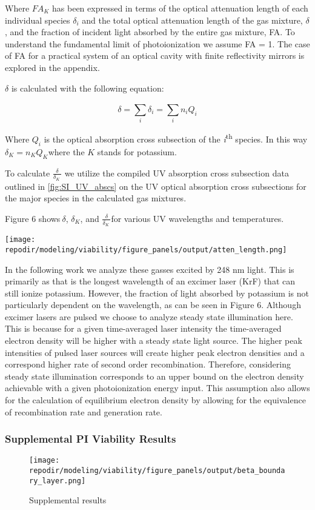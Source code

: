 Where \(FA_{K}\) has been expressed in terms of the optical attenuation length of each individual species \(\delta_{i}\) and the total optical attenuation length of the gas mixture, \(\delta\), and the fraction of incident light absorbed by the entire gas mixture, FA. To understand the fundamental limit of photoionization we assume FA = 1. The case of FA for a practical system of an optical cavity with finite reflectivity mirrors is explored in the appendix.

\(\delta\) is calculated with the following equation:

\begin{equation}
\delta = \sum_{i}^{}\delta_{i} = \sum_{i}^{}{n_{i}Q_{i}}
\end{equation}

Where \(Q_{i}\) is the optical absorption cross subsection of the \emph{i}\textsuperscript{th} species. In this way \(\delta_{K} = n_{K}Q_{K}\)where the \(K\) stands for potassium.

To calculate \(\frac{\delta}{\delta_{K}\ }\) we utilize the compiled UV absorption cross subsection data outlined in \ref{fig:SI_UV_abscs} on the UV optical absorption cross subsections for the major species in the calculated gas mixtures.

Figure 6 shows\(\ \delta\), \(\delta_{K}\), and \(\frac{\delta}{\delta_{K}\ }\)for various UV wavelengths and temperatures.

\texttt{[image: \\repodir/modeling/viability/figure\_panels/output/atten\_length.png]}

In the following work we analyze these gasses excited by 248 nm light. This is primarily as that is the longest wavelength of an excimer laser (KrF) that can still ionize potassium. However, the fraction of light absorbed by potassium is not particularly dependent on the wavelength, as can be seen in Figure 6. Although excimer lasers are pulsed we choose to analyze steady state illumination here. This is because for a given time-averaged laser intensity the time-averaged electron density will be higher with a steady state light source. The higher peak intensities of pulsed laser sources will create higher peak electron densities and a correspond higher rate of second order recombination. Therefore, considering steady state illumination corresponds to an upper bound on the electron density achievable with a given photoionization energy input. This assumption also allows for the calculation of equilibrium electron density by allowing for the equivalence of recombination rate and generation rate.

\clearpage

\subsubsection{Supplemental PI Viability Results}

\begin{figure}
\centering
\texttt{[image: \\repodir/modeling/viability/figure\_panels/output/beta\_boundary\_layer.png]}
\caption{Supplemental results}
\end{figure}
